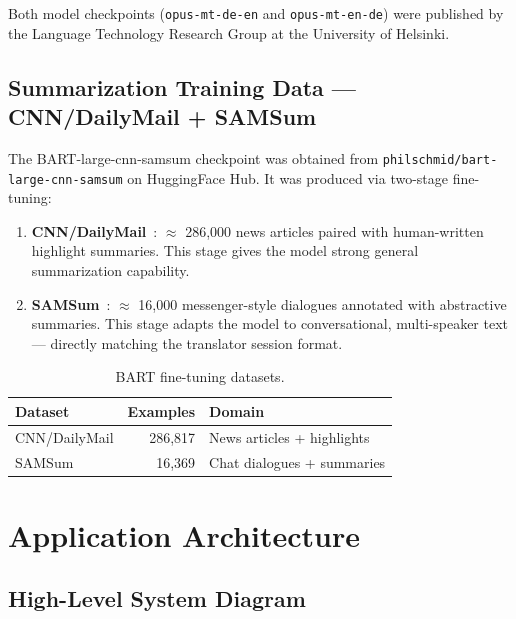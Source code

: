 \documentclass[12pt,a4paper]{report}
\begin{document}
Both model checkpoints (\texttt{opus-mt-de-en} and \texttt{opus-mt-en-de})
were published by the Language Technology Research Group at the
University of Helsinki.

\subsection{Summarization Training Data — CNN/DailyMail + SAMSum}

The BART-large-cnn-samsum checkpoint was obtained from
\texttt{philschmid/bart-large-cnn-samsum} on HuggingFace Hub. It was
produced via two-stage fine-tuning:

\begin{enumerate}
  \item \textbf{CNN/DailyMail}~\cite{hermann2015teaching}: $\approx$
        286{,}000 news articles paired with human-written highlight
        summaries. This stage gives the model strong general
        summarization capability.
  \item \textbf{SAMSum}~\cite{gliwa2019samsum}: $\approx$ 16{,}000
        messenger-style dialogues annotated with abstractive summaries.
        This stage adapts the model to conversational, multi-speaker
        text — directly matching the translator session format.
\end{enumerate}

\begin{table}[H]
  \centering
  \begin{tabular}{lrl}
    \toprule
    \textbf{Dataset} & \textbf{Examples} & \textbf{Domain} \\
    \midrule
    CNN/DailyMail    & 286{,}817 & News articles + highlights \\
    SAMSum           & 16{,}369  & Chat dialogues + summaries \\
    \bottomrule
  \end{tabular}
  \caption{BART fine-tuning datasets.}
\end{table}

\section{Application Architecture}

\subsection{High-Level System Diagram}
\end{document}
